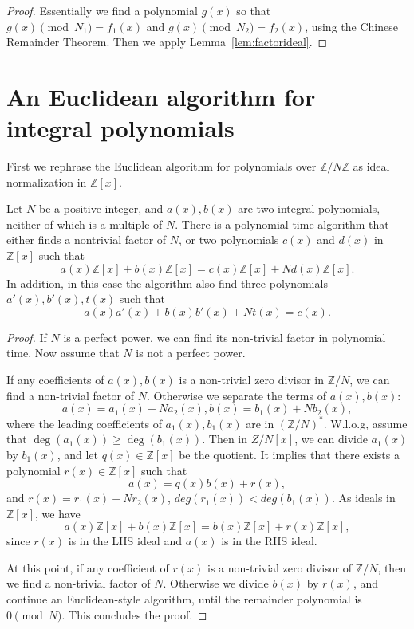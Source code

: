 \documentclass[runningheads, letter]{llncs}
\newcommand{\Z}{{\mathbb Z}}
\begin{document}
\begin{proof}
Essentially we find a polynomial \( g(x) \) so that
\( g(x) \pmod{N_1} = f_1(x) \)
and \( g(x) \pmod{N_2} = f_2(x) \), using the
Chinese Remainder Theorem.
Then we apply Lemma~\ref{lem:factorideal}.
\end{proof}


\section{An Euclidean algorithm for integral polynomials}

First we rephrase the Euclidean algorithm for polynomials
over \( \Z/N\Z \) as ideal normalization in \( \Z [x] \).

\begin{lemma}\label{lem:polygcd} 
  Let \( N \) be a positive integer, %
  and \( a(x), b(x) \) are two integral polynomials,
  neither of which is a multiple of \( N \).
  There is a polynomial time algorithm that either finds
  a nontrivial factor of \( N \), or two polynomials
  \( c(x) \) and \( d(x ) \) in \( \Z[x] \)  such that
  \[ a(x)\Z[x] + b(x)\Z[x] = c(x)\Z[x] + N d(x)\Z[x].  \]
  In addition, in this case the algorithm also find three polynomials
  \( a'(x), b'(x), t(x) \)  such that
  \[ a(x) a'(x) + b(x) b'(x) + N t(x) = c(x).  \]
\end{lemma}

\begin{proof}
  If \( N \) is a perfect power, we can find its non-trivial factor
  in polynomial time. Now assume that \( N \) is not a perfect power.

  If any coefficients of \( a(x), b(x) \) is a
  non-trivial zero divisor in \( \Z/N \), we can find
  a non-trivial factor of \( N \).
  Otherwise we separate the terms of \( a(x), b(x) \):
  \[ a(x)=a_1 (x) + N a_2(x), b(x) = b_1(x) + N b_2(x),  \]
  where the leading coefficients of \( a_1(x), b_1(x) \)
  are in \( ( \Z/N )^* \). W.l.o.g, assume that
  \( \deg(a_1(x)) \geq \deg (b_1(x)). \)
  Then in \( Z/N[x] \), we can divide \( a_1(x) \)
  by \( b_1(x) \), and let \( q(x) \in \Z[x] \) be the quotient.
  It implies that there exists a polynomial \( r(x) \in \Z[x] \)
  such that 
\[ a(x) = q(x) b(x) + r(x), \]
and \( r(x) = r_1(x) + N r_2(x)\),
\( deg(r_1 (x)) < deg(b_1 (x)) \).
As ideals in \( \Z[x] \), we have
\[ a(x) \Z[x] + b(x) \Z[x] = b(x) \Z[x] + r(x) \Z [x],  \]
since \( r(x) \) is in the LHS ideal
and \( a(x) \) is in the RHS ideal.

At this point, if any coefficient of \( r(x) \)
is a non-trivial zero divisor of \( \Z/N \),
then we find a non-trivial factor of \( N \).
Otherwise we divide \( b(x) \) by \( r(x) \),
and continue an Euclidean-style algorithm,
until the remainder polynomial is \( 0 \pmod{N} \).
This concludes the proof.
\end{proof}
\end{document}

